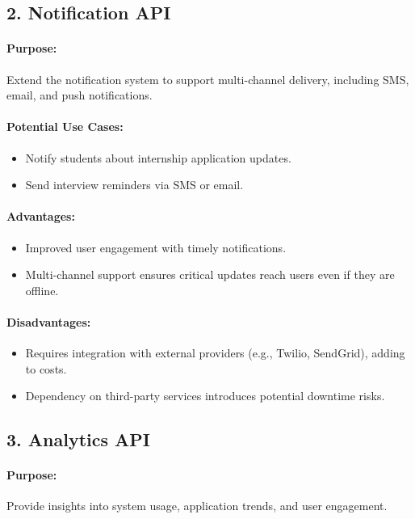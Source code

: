 \subsection*{2. Notification API}
\paragraph{Purpose:}
Extend the notification system to support multi-channel delivery, including SMS, email, and push notifications.

\paragraph{Potential Use Cases:}
\begin{itemize}
    \item Notify students about internship application updates.
    \item Send interview reminders via SMS or email.
\end{itemize}

\paragraph{Advantages:}
\begin{itemize}
    \item Improved user engagement with timely notifications.
    \item Multi-channel support ensures critical updates reach users even if they are offline.
\end{itemize}

\paragraph{Disadvantages:}
\begin{itemize}
    \item Requires integration with external providers (e.g., Twilio, SendGrid), adding to costs.
    \item Dependency on third-party services introduces potential downtime risks.
\end{itemize}

\subsection*{3. Analytics API}
\paragraph{Purpose:}
Provide insights into system usage, application trends, and user engagement.


